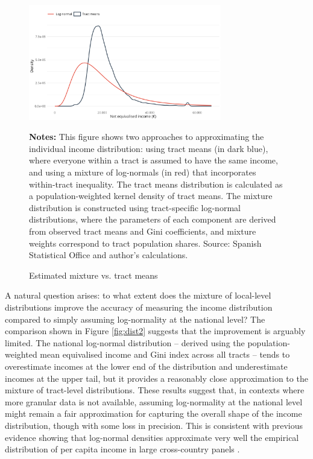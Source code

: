 \begin{figure}[H]
\begin{center}
\captionsetup{justification=centering}
\caption{Estimated mixture vs. tract means}
\label{fig:distributions}
\includegraphics[width=0.75\textwidth]{output/tract_vs_individual_income_distribution.png}
\end{center}
\begin{fignotes2}
\textbf{Notes:} This figure shows two approaches to approximating the individual income distribution: using tract means (in dark blue), where everyone within a tract is assumed to have the same income, and using a mixture of log-normals (in red) that incorporates within-tract inequality. The tract means distribution is calculated as a population-weighted kernel density of tract means. The mixture distribution is constructed using tract-specific log-normal distributions, where the parameters of each component are derived from observed tract means and Gini coefficients, and mixture weights correspond to tract population shares. Source: Spanish Statistical Office and author's calculations.
\end{fignotes2}
\end{figure}

A natural question arises: to what extent does the mixture of local-level distributions improve the accuracy of measuring the income distribution compared to simply assuming log-normality at the national level? The comparison shown in Figure \ref{fig:dist2} suggests that the improvement is arguably limited. The national log-normal distribution -- derived using the population-weighted mean equivalised income and Gini index across all tracts -- tends to overestimate incomes at the lower end of the distribution and underestimate incomes at the upper tail, but it provides a reasonably close approximation to the mixture of tract-level distributions. These results suggest that, in contexts where more granular data is not available, assuming log-normality at the national level might remain a fair approximation for capturing the overall shape of the income distribution, though with some loss in precision. This is consistent with previous evidence showing that log-normal densities approximate very well the empirical distribution of per capita income in large cross-country panels \citep{lopez2006normal}.

